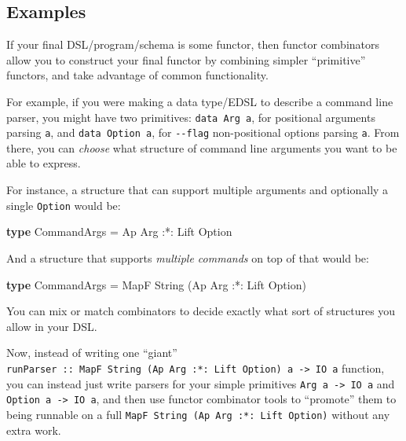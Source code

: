 \documentclass[]{article}
\newenvironment{Shaded}{}{}
\newcommand{\DataTypeTok}[1]{\textcolor[rgb]{0.56,0.13,0.00}{#1}}
\newcommand{\KeywordTok}[1]{\textcolor[rgb]{0.00,0.44,0.13}{\textbf{#1}}}
\newcommand{\NormalTok}[1]{#1}
\newcommand{\OperatorTok}[1]{\textcolor[rgb]{0.40,0.40,0.40}{#1}}
\newcommand{\OtherTok}[1]{\textcolor[rgb]{0.00,0.44,0.13}{#1}}
\begin{document}
\hypertarget{examples}{%
\subsection{Examples}\label{examples}}

If your final DSL/program/schema is some functor, then functor combinators allow
you to construct your final functor by combining simpler ``primitive'' functors,
and take advantage of common functionality.

For example, if you were making a data type/EDSL to describe a command line
parser, you might have two primitives: \texttt{data\ Arg\ a}, for positional
arguments parsing \texttt{a}, and \texttt{data\ Option\ a}, for
\texttt{-\/-flag} non-positional options parsing \texttt{a}. From there, you can
\emph{choose} what structure of command line arguments you want to be able to
express.

For instance, a structure that can support multiple arguments and optionally a
single \texttt{Option} would be:

\begin{Shaded}
\begin{Highlighting}[]
\KeywordTok{type} \DataTypeTok{CommandArgs} \OtherTok{=} \DataTypeTok{Ap} \DataTypeTok{Arg} \OperatorTok{:*:} \DataTypeTok{Lift} \DataTypeTok{Option}
\end{Highlighting}
\end{Shaded}

And a structure that supports \emph{multiple commands} on top of that would be:

\begin{Shaded}
\begin{Highlighting}[]
\KeywordTok{type} \DataTypeTok{CommandArgs} \OtherTok{=} \DataTypeTok{MapF} \DataTypeTok{String}\NormalTok{ (}\DataTypeTok{Ap} \DataTypeTok{Arg} \OperatorTok{:*:} \DataTypeTok{Lift} \DataTypeTok{Option}\NormalTok{)}
\end{Highlighting}
\end{Shaded}

You can mix or match combinators to decide exactly what sort of structures you
allow in your DSL.

Now, instead of writing one ``giant''
\texttt{runParser\ ::\ MapF\ String\ (Ap\ Arg\ :*:\ Lift\ Option)\ a\ -\textgreater{}\ IO\ a}
function, you can instead just write parsers for your simple primitives
\texttt{Arg\ a\ -\textgreater{}\ IO\ a} and
\texttt{Option\ a\ -\textgreater{}\ IO\ a}, and then use functor combinator
tools to ``promote'' them to being runnable on a full
\texttt{MapF\ String\ (Ap\ Arg\ :*:\ Lift\ Option)} without any extra work.
\end{document}

